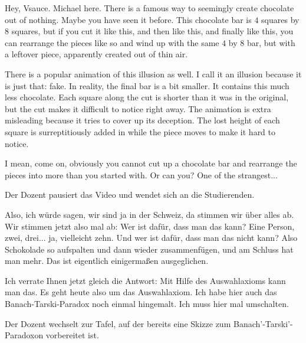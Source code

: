 \begin{spoken-clean}[00:00:28 - 00:01:46]
Hey, Vsauce. Michael here. There is a famous way to seemingly create chocolate out of nothing. Maybe you have seen it before. This chocolate bar is $4$ squares by $8$ squares, but if you cut it like this, and then like this, and finally like this, you can rearrange the pieces like so and wind up with the same $4$ by $8$ bar, but with a leftover piece, apparently created out of thin air.

There is a popular animation of this illusion as well. I call it an illusion because it is just that: fake. In reality, the final bar is a bit smaller. It contains this much less chocolate. Each square along the cut is shorter than it was in the original, but the cut makes it difficult to notice right away. The animation is extra misleading because it tries to cover up its deception. The lost height of each square is surreptitiously added in while the piece moves to make it hard to notice.

I mean, come on, obviously you cannot cut up a chocolate bar and rearrange the pieces into more than you started with. Or can you? One of the strangest...
\end{spoken-clean}

\begin{meta-note}
Der Dozent pausiert das Video und wendet sich an die Studierenden.
\end{meta-note}

\begin{spoken-clean}[00:01:46 - 00:02:32]
Also, ich würde sagen, wir sind ja in der Schweiz, da stimmen wir über alles ab. Wir stimmen jetzt also mal ab: Wer ist dafür, dass man das kann? Eine Person, zwei, drei... ja, vielleicht zehn. Und wer ist dafür, dass man das nicht kann? Also Schokolade so aufspalten und dann wieder zusammenfügen, und am Schluss hat man mehr. Das ist eigentlich einigermaßen ausgeglichen.

Ich verrate Ihnen jetzt gleich die Antwort: Mit Hilfe des Auswahlaxioms kann man das. Es geht heute also um das Auswahlaxiom. Ich habe hier auch das Banach-Tarski-Paradox noch einmal hingemalt. Ich muss hier mal umschalten.
\end{spoken-clean}

\begin{meta-note}[Tafelübergang]

Der Dozent wechselt zur Tafel, auf der bereits eine Skizze zum Banach'-Tarski'-Paradoxon vorbereitet ist.

\end{meta-note}

